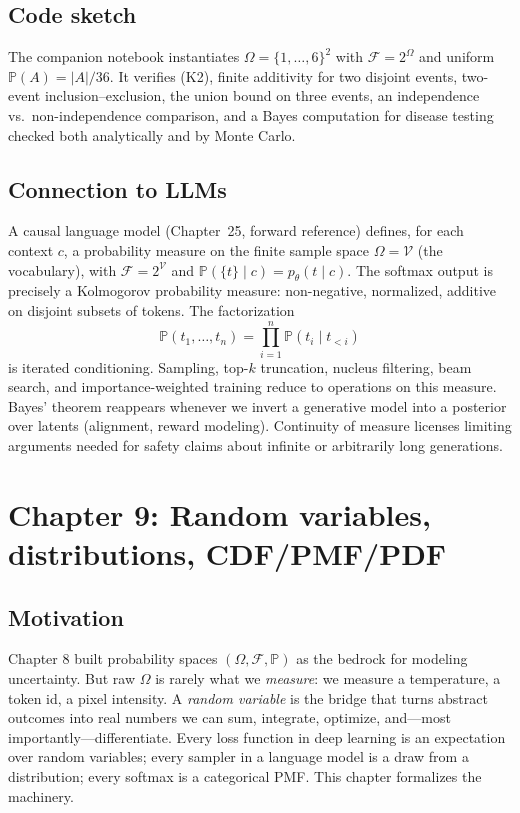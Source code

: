 \documentclass[11pt]{article}
\theoremstyle{remark}
\begin{document}
\subsection*{Code sketch}

The companion notebook instantiates $\Omega = \{1, \ldots, 6\}^{2}$ with $\mathcal{F} = 2^{\Omega}$ and uniform $\mathbb{P}(A) = |A| / 36$. It verifies (K2), finite additivity for two disjoint events, two-event inclusion--exclusion, the union bound on three events, an independence vs.\ non-independence comparison, and a Bayes computation for disease testing checked both analytically and by Monte Carlo.

\subsection*{Connection to LLMs}

A causal language model (Chapter~25, forward reference) defines, for each context $c$, a probability measure on the finite sample space $\Omega = \mathcal{V}$ (the vocabulary), with $\mathcal{F} = 2^{\mathcal{V}}$ and $\mathbb{P}(\{t\} \mid c) = p_{\theta}(t \mid c)$. The softmax output is precisely a Kolmogorov probability measure: non-negative, normalized, additive on disjoint subsets of tokens. The factorization
\[
  \mathbb{P}(t_{1}, \ldots, t_{n}) = \prod_{i=1}^{n} \mathbb{P}(t_{i} \mid t_{<i})
\]
is iterated conditioning. Sampling, top-$k$ truncation, nucleus filtering, beam search, and importance-weighted training reduce to operations on this measure. Bayes' theorem reappears whenever we invert a generative model into a posterior over latents (alignment, reward modeling). Continuity of measure licenses limiting arguments needed for safety claims about infinite or arbitrarily long generations.


\section*{Chapter 9: Random variables, distributions, CDF/PMF/PDF}

\subsection*{Motivation}

Chapter 8 built probability spaces $(\Omega, \mathcal{F}, \mathbb{P})$ as the bedrock for modeling uncertainty. But raw $\Omega$ is rarely what we \emph{measure}: we measure a temperature, a token id, a pixel intensity. A \emph{random variable} is the bridge that turns abstract outcomes into real numbers we can sum, integrate, optimize, and---most importantly---differentiate. Every loss function in deep learning is an expectation over random variables; every sampler in a language model is a draw from a distribution; every softmax is a categorical PMF. This chapter formalizes the machinery.
\end{document}
